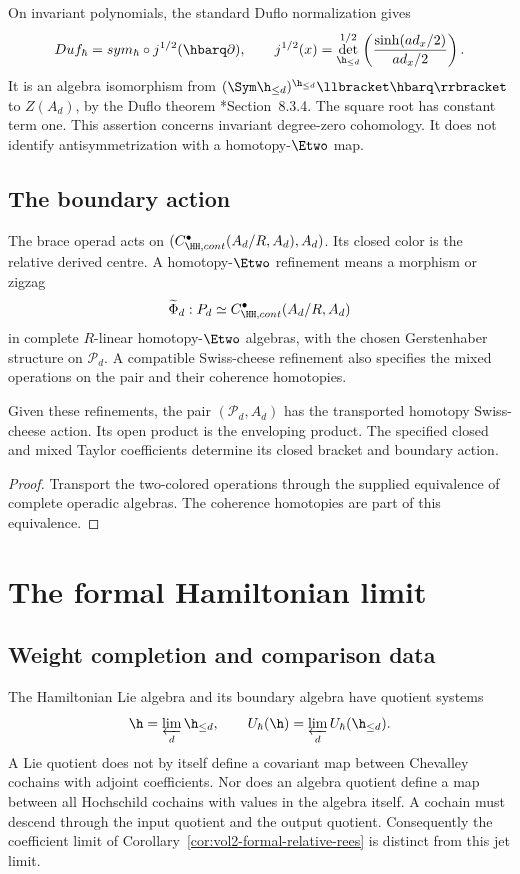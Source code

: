 On invariant polynomials, the standard Duflo normalization gives
\[
 \operatorname{Duf}_\hbar
 =\operatorname{sym}_\hbar\circ j^{1/2}(\hbarq\partial),
 \qquad
 j^{1/2}(x)=
 \det_{\h_{\le d}}^{1/2}
 \left(\frac{\sinh(\operatorname{ad}_x/2)}
 {\operatorname{ad}_x/2}\right).
\]
It is an algebra isomorphism from
$(\Sym\h_{\le d})^{\h_{\le d}}\llbracket\hbarq\rrbracket$
to $Z(A_d)$, by the Duflo theorem
\cite{KontsevichDQ}*{Section~8.3.4}.
The square root has constant term one.
This assertion concerns invariant degree-zero cohomology.
It does not identify antisymmetrization with a homotopy-$\Etwo$ map.

\section{The boundary action}
The brace operad acts on
$(C^\bullet_{\HH,\mathrm{cont}}(A_d/R,A_d),A_d)$.
Its closed color is the relative derived centre.
A homotopy-$\Etwo$ refinement means a morphism or zigzag
\[
 \widetilde\Phi_d:\mathcal P_d
 \simeq C^\bullet_{\HH,\mathrm{cont}}(A_d/R,A_d)
\]
in complete $R$-linear homotopy-$\Etwo$ algebras,
with the chosen Gerstenhaber structure on $\mathcal P_d$.
A compatible Swiss-cheese refinement also specifies the mixed operations
on the pair and their coherence homotopies.

\begin{corollary}\label{cor:vol2-open-closed-refinement}
Given these refinements, the pair $(\mathcal P_d,A_d)$ has the transported
homotopy Swiss-cheese action.
Its open product is the enveloping product.
The specified closed and mixed Taylor coefficients determine its
closed bracket and boundary action.
\end{corollary}
\begin{proof}
Transport the two-colored operations through the supplied equivalence
of complete operadic algebras.
The coherence homotopies are part of this equivalence.
\end{proof}

\chapter{The formal Hamiltonian limit}
\section{Weight completion and comparison data}
The Hamiltonian Lie algebra and its boundary algebra have quotient systems
\[
 \h=\varprojlim_d\h_{\le d},\qquad
 \widehat U_\hbar(\h)=\varprojlim_d U_\hbar(\h_{\le d}).
\]
A Lie quotient does not by itself define a covariant map between
Chevalley cochains with adjoint coefficients.
Nor does an algebra quotient define a map between all Hochschild
cochains with values in the algebra itself.
A cochain must descend through the input quotient and the output quotient.
Consequently the coefficient limit of
Corollary~\ref{cor:vol2-formal-relative-rees} is distinct from this jet limit.


